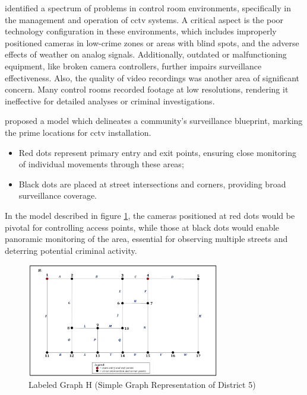\citet{rfc42} identified a spectrum of problems in control room environments, 
specifically in the management and operation of \ac{cctv} systems. A critical aspect is the 
poor technology configuration in these environments, which includes improperly positioned cameras in 
low-crime zones or areas with blind spots, and the adverse effects of weather on analog signals. Additionally, 
outdated or malfunctioning equipment, like broken camera controllers, further impairs surveillance effectiveness. 
Also, the quality of video recordings was another area of significant concern. Many control rooms recorded footage at 
low resolutions, rendering it ineffective for detailed analyses or criminal investigations.

\citet{rfc46} proposed a model which delineates a community's surveillance blueprint, marking the prime locations for \ac{cctv} installation. 
\begin{itemize}
    \item Red dots represent primary entry and exit points, ensuring close monitoring of individual movements through these areas;
    \item Black dots are placed at street intersections and corners, providing broad surveillance coverage.
\end{itemize}

In the model described in figure \ref{fig:cctv-positions}, the cameras positioned at red dots 
would be pivotal for controlling access points, while those at black dots would enable panoramic monitoring 
of the area, essential for observing multiple streets and deterring potential criminal activity. 

\begin{figure}[h]
    \centering 
    \includegraphics[width=0.75\textwidth]{figs/cctv-positions.png} 
    \caption{Labeled Graph H (Simple Graph Representation of District 5) \cite{rfc46}}
    \label{fig:cctv-positions}
\end{figure}

